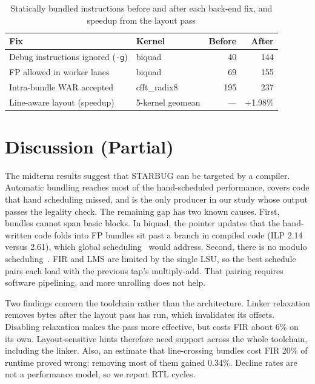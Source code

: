 \documentclass[conference]{IEEEtran}
\begin{document}
\begin{table}[t]
\centering
\caption{Statically bundled instructions before and after each back-end fix, and speedup from the layout pass}
\label{tab:ablation}
\footnotesize
\begin{tabular}{@{}llrr@{}}
\toprule
Fix & Kernel & Before & After\\
\midrule
Debug instructions ignored (\texttt{-g}) & biquad & 40 & 144\\
FP allowed in worker lanes & biquad & 69 & 155\\
Intra-bundle WAR accepted & cfft\_radix8 & 195 & 237\\
Line-aware layout (speedup) & 5-kernel geomean & --- & +1.98\%\\
\bottomrule
\end{tabular}
\end{table}

\section{Discussion (Partial)}
\label{sec:discussion}
The midterm results suggest that STARBUG can be targeted by a compiler. Automatic bundling reaches most of the hand-scheduled performance, covers code that hand scheduling missed, and is the only producer in our study whose output passes the legality check. The remaining gap has two known causes. First, bundles cannot span basic blocks. In biquad, the pointer updates that the hand-written code folds into FP bundles sit past a branch in compiled code (ILP 2.14 versus 2.61), which global scheduling~\cite{bernstein-rodeh-1991,hwu-superblock-1993} would address. Second, there is no modulo scheduling~\cite{rau-modulo-1994}. FIR and LMS are limited by the single LSU, so the best schedule pairs each load with the previous tap's multiply-add. That pairing requires software pipelining, and more unrolling does not help.

Two findings concern the toolchain rather than the architecture. Linker relaxation removes bytes after the layout pass has run, which invalidates its offsets. Disabling relaxation makes the pass more effective, but costs FIR about 6\% on its own. Layout-sensitive hints therefore need support across the whole toolchain, including the linker. Also, an estimate that line-crossing bundles cost FIR 20\% of runtime proved wrong: removing most of them gained 0.34\%. Decline rates are not a performance model, so we report RTL cycles.
\end{document}
